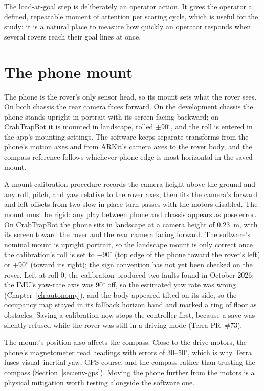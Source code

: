 The load-at-goal step is deliberately an operator action.
It gives the operator a defined, repeatable moment of attention per scoring cycle, which is useful for the study: it is a natural place to measure how quickly an operator responds when several rovers reach their goal lines at once.

\section{The phone mount}
\label{sec:rover-mount}

The phone is the rover's only sensor head, so its mount sets what the rover sees.
On both chassis the rear camera faces forward.
On the development chassis the phone stands upright in portrait with its screen facing backward; on CrabTrapBot it is mounted in landscape, rolled $\pm$90$^\circ$, and the roll is entered in the app's mounting settings.
The software keeps separate transforms from the phone's motion axes and from ARKit's camera axes to the rover body, and the compass reference follows whichever phone edge is most horizontal in the saved mount.

A mount calibration procedure records the camera height above the ground and any roll, pitch, and yaw relative to the rover axes, then fits the camera's forward and left offsets from two slow in-place turn passes with the motors disabled.
The mount must be rigid: any play between phone and chassis appears as pose error.
On CrabTrapBot the phone sits in landscape at a camera height of 0.23~m, with its screen toward the rover and the rear camera facing forward.
The software's nominal mount is upright portrait, so the landscape mount is only correct once the calibration's roll is set to $-90^\circ$ (top edge of the phone toward the rover's left) or $+90^\circ$ (toward its right); the sign convention has not yet been checked on the rover.
Left at roll 0, the calibration produced two faults found in October 2026: the IMU's yaw-rate axis was 90$^\circ$ off, so the estimated yaw rate was wrong (Chapter~\ref{ch:autonomy}), and the body appeared tilted on its side, so the occupancy map stayed in its fallback horizon band and marked a ring of floor as obstacles.
Saving a calibration now stops the controller first, because a save was silently refused while the rover was still in a driving mode (Terra PR~\#73).

The mount's position also affects the compass.
Close to the drive motors, the phone's magnetometer read headings with errors of 30--50$^\circ$, which is why Terra fuses visual--inertial yaw, GPS course, and the compass rather than trusting the compass (Section~\ref{sec:env-gps}).
Moving the phone further from the motors is a physical mitigation worth testing alongside the software one.

